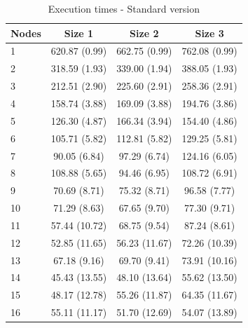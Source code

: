 \documentclass{article}
\begin{document}
\begin{table}[H]
\centering
\begin{tabular}{|l|c|c|c|}
\hline
Nodes & Size 1 & Size 2 & Size 3 \\ \hline
1 & 620.87 (0.99) & 662.75 (0.99) & 762.08 (0.99) \\ \hline
2 & 318.59 (1.93) & 339.00 (1.94) & 388.05 (1.93) \\ \hline
3 & 212.51 (2.90) & 225.60 (2.91) & 258.36 (2.91) \\ \hline
4 & 158.74 (3.88) & 169.09 (3.88) & 194.76 (3.86) \\ \hline
5 & 126.30 (4.87) & 166.34 (3.94) & 154.40 (4.86) \\ \hline
6 & 105.71 (5.82) & 112.81 (5.82) & 129.25 (5.81) \\ \hline
7 & 90.05 (6.84) & 97.29 (6.74) & 124.16 (6.05) \\ \hline
8 & 108.88 (5.65) & 94.46 (6.95) & 108.72 (6.91) \\ \hline
9 & 70.69 (8.71) & 75.32 (8.71) & 96.58 (7.77) \\ \hline
10 & 71.29 (8.63) & 67.65 (9.70) & 77.30 (9.71) \\ \hline
11 & 57.44 (10.72) & 68.75 (9.54) & 87.24 (8.61) \\ \hline
12 & 52.85 (11.65) & 56.23 (11.67) & 72.26 (10.39) \\ \hline
13 & 67.18 (9.16) & 69.70 (9.41) & 73.91 (10.16) \\ \hline
14 & 45.43 (13.55) & 48.10 (13.64) & 55.62 (13.50) \\ \hline
15 & 48.17 (12.78) & 55.26 (11.87) & 64.35 (11.67) \\ \hline
16 & 55.11 (11.17) & 51.70 (12.69) & 54.07 (13.89) \\ \hline
\end{tabular}
\caption{Execution times - Standard version} \label{tab:standardtimes}
\end{table}
\end{document}
